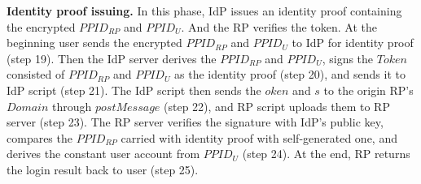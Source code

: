 \vspace{0.5mm}\noindent\textbf{Identity proof issuing.} In this phase, IdP issues an identity proof containing the encrypted $PPID_{RP}$ and $PPID_U$. And the RP verifies the token.
At the beginning user sends the encrypted $PPID_{RP}$ and $PPID_U$ to IdP for identity proof (step 19).
Then the IdP server derives the $PPID_{RP}$ and $PPID_U$, signs the $Token$ consisted of $PPID_{RP}$ and $PPID_U$ as the identity proof (step 20), and sends it to IdP script (step 21).
The IdP script then sends the $oken$ and $s$ to the origin RP's $Domain$ through $postMessage$ (step 22), and  RP script uploads them to RP server (step 23).
The RP server verifies the signature with IdP's public key, compares the $PPID_{RP}$ carried with identity proof with self-generated one, and derives the constant user account from $PPID_U$ (step 24).
At the end, RP returns the login result back to user (step 25).

